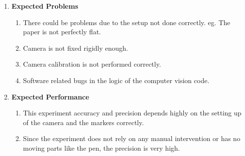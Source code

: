 \documentclass[10pt,a4paper]{article}
\begin{document}
\begin{enumerate}[label=\Roman*]
\item
\textbf{Expected Problems}\\
\begin{enumerate}
	\item
	There could be problems due to the setup not done correctly. eg. The paper is not perfectly flat.
	\item
	Camera is not fixed rigidly enough.
	\item
	Camera calibration is not performed correctly.
	\item
	Software related bugs in the logic of the computer vision code.
\end{enumerate}
\vspace{0.5cm}

\item
\textbf{Expected Performance}\\
\begin{enumerate}
	\item
	This experiment accuracy and precision depends highly on the setting up of the camera and the markers correctly.
	\item
	Since the experiment does not rely on any manual intervention or has no moving parts like the pen, the precision is very high.
\end{enumerate}
\vspace{0.5cm}

\end{enumerate}
\end{document}
